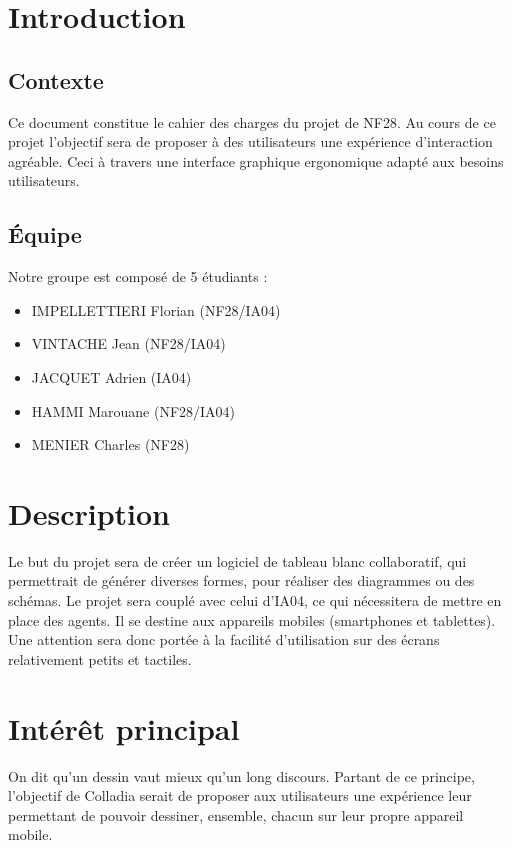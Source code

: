 \documentclass[a4paper,11pt]{article}
\begin{document}


\newpage
\section{Introduction}

\subsection{Contexte}
Ce document constitue le cahier des charges du projet de NF28. Au cours de ce projet l'objectif sera de proposer à des utilisateurs une expérience d'interaction agréable. Ceci à travers une interface graphique ergonomique adapté aux besoins utilisateurs.

\subsection{Équipe}
Notre groupe est composé de 5 étudiants :
\begin{itemize}
\item IMPELLETTIERI Florian (NF28/IA04)
\item VINTACHE Jean (NF28/IA04)
\item JACQUET Adrien (IA04)
\item HAMMI Marouane (NF28/IA04)
\item MENIER Charles (NF28)
\end{itemize}



\section{Description}
Le but du projet sera de créer un logiciel de tableau blanc collaboratif, qui permettrait de générer diverses formes, pour réaliser des diagrammes ou des schémas.
Le projet sera couplé avec celui d'IA04, ce qui nécessitera de mettre en place des agents. Il se destine aux appareils mobiles (smartphones et tablettes). Une attention sera donc portée à la facilité d'utilisation sur des écrans relativement petits et tactiles.



\section{Intérêt principal}
On dit qu'un dessin vaut mieux qu'un long discours. Partant de ce principe, l'objectif de Colladia serait de proposer aux utilisateurs une expérience leur permettant de pouvoir dessiner, ensemble, chacun sur leur propre appareil mobile. 
\end{document}
